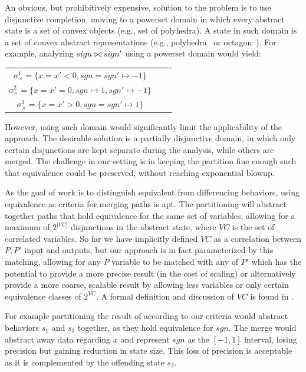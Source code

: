 An obvious, but prohibitively expensive, solution to the problem is to use disjunctive completion, moving to a powerset domain in which every abstract state is a set of convex objects (e.g., set of polyhedra).
A state in such domain is a set of convex abstract representations (e.g., polyhedra~\cite{CousotHalbwachs78} or octagon~\cite{Mine2006}). For example, analyzing $sign \bowtie sign'$ using a powerset domain would yield:

\vspace{0.1in}
\begin{tabular}{ccc}
\hspace{1cm} $\sigma_{\times}^1 = \{x = x' < 0, sgn = sgn' \mapsto -1\}$
\\
\hspace{1cm} $\sigma_{\times}^2 = \{x = x' = 0, sgn \mapsto 1, sgn' \mapsto -1\}$
\\
\hspace{1cm} $\sigma_{\times}^3 = \{x = x' > 0, sgn = sgn' \mapsto 1\}$
\\
\end{tabular}
\vspace{0.1in}

However, using such domain would significantly limit the applicability of the approach. The desirable solution is a partially disjunctive domain, in which only certain disjunctions are kept separate during the analysis, while others are merged. The challenge in our setting is in keeping the partition fine enough such that equivalence could be preserved, without reaching exponential blowup.

As the goal of work is to distinguish equivalent from differencing behaviors, using equivalence as criteria for merging paths is apt. The partitioning will abstract together paths that hold equivalence for the same set of variables, allowing for a maximum of $2^{|VC|}$ disjunctions in the abstract state, where $VC$ is the set of correlated variables. So far we have implicitly defined $VC$ as a correlation between $P,P'$ input and outputs, but our approach is in fact parameterized by this matching, allowing for any $P$ variable to be matched with any of $P'$ which has the potential to provide a more precise result (in the cost of scaling) or alternatively provide a more coarse, scalable result by allowing less variables or only certain equivalence classes of $2^{VC}$. A formal definition and discussion of $VC$ is found in .

For example partitioning the result of  according to our criteria would abstract behaviors $s_1$ and $s_3$ together, as they hold equivalence for $sgn$. The merge would abstract away data regarding $x$ and represent $sgn$ as the $[-1,1]$ interval, losing precision but gaining reduction in state size. This loss of precision is acceptable as it is complemented by the offending state $s_2$.

